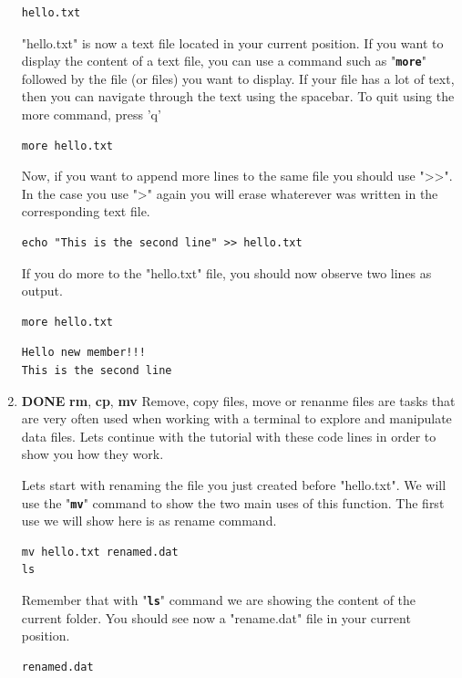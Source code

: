 \documentclass[11pt]{article}
\begin{document}
\begin{enumerate}
\begin{verbatim}
hello.txt
\end{verbatim}

"hello.txt" is now a text file located in your current position. If you want to display the content of a text file, you can use a command such as "\textbf{\texttt{more}}" followed by the file (or files) you want to display. If your file has a lot of text, then you can navigate through the text using the spacebar. To quit using the more command, press 'q'
\begin{verbatim}
more hello.txt
\end{verbatim}

Now, if you want to append more lines to the same file you should use ">>". In the case you use ">" again you will erase whaterever was written in the corresponding text file.
\begin{verbatim}
echo "This is the second line" >> hello.txt
\end{verbatim}
If you do more to the "hello.txt" file, you should now observe two lines as output.
\begin{verbatim}
more hello.txt
\end{verbatim}

\begin{verbatim}
Hello new member!!!
This is the second line
\end{verbatim}

\item {\bfseries\sffamily DONE} \textbf{rm}, \textbf{cp}, \textbf{mv}
\label{sec-2-1-3-3}
Remove, copy files, move or renanme files are tasks that are very often used when working with a terminal to explore and manipulate data files. Lets continue with the tutorial with these code lines in order to show you how they work.

Lets start with renaming the file you just created before "hello.txt". We will use the "\textbf{\texttt{mv}}" command to show the two main uses of this function. The first use we will show here is as rename command.
\begin{verbatim}
mv hello.txt renamed.dat
ls
\end{verbatim}

Remember that with "\textbf{\texttt{ls}}" command we are showing the content of the current folder. You should see now a "rename.dat" file in your current position.
\begin{verbatim}
renamed.dat
\end{verbatim}


\end{enumerate}
\end{document}
